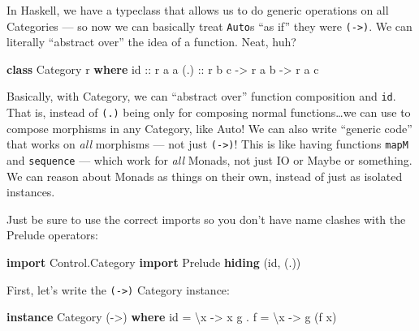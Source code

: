 \documentclass[]{article}
\newenvironment{Shaded}{}{}
\newcommand{\DataTypeTok}[1]{\textcolor[rgb]{0.56,0.13,0.00}{#1}}
\newcommand{\FunctionTok}[1]{\textcolor[rgb]{0.02,0.16,0.49}{#1}}
\newcommand{\KeywordTok}[1]{\textcolor[rgb]{0.00,0.44,0.13}{\textbf{#1}}}
\newcommand{\NormalTok}[1]{#1}
\newcommand{\OperatorTok}[1]{\textcolor[rgb]{0.40,0.40,0.40}{#1}}
\newcommand{\OtherTok}[1]{\textcolor[rgb]{0.00,0.44,0.13}{#1}}
\begin{document}
In Haskell, we have a typeclass that allows us to do generic operations on all
Categories --- so now we can basically treat \texttt{Auto}s ``as if'' they were
\texttt{(-\textgreater{})}. We can literally ``abstract over'' the idea of a
function. Neat, huh?

\begin{Shaded}
\begin{Highlighting}[]
\KeywordTok{class} \DataTypeTok{Category}\NormalTok{ r }\KeywordTok{where}
\OtherTok{    id  ::}\NormalTok{ r a a}
\OtherTok{    (.) ::}\NormalTok{ r b c }\OtherTok{{-}\textgreater{}}\NormalTok{ r a b }\OtherTok{{-}\textgreater{}}\NormalTok{ r a c}
\end{Highlighting}
\end{Shaded}

Basically, with Category, we can ``abstract over'' function composition and
\texttt{id}. That is, instead of \texttt{(.)} being only for composing normal
functions\ldots we can use to compose morphisms in any Category, like Auto! We
can also write ``generic code'' that works on \emph{all} morphisms --- not just
\texttt{(-\textgreater{})}! This is like having functions \texttt{mapM} and
\texttt{sequence} --- which work for \emph{all} Monads, not just IO or Maybe or
something. We can reason about Monads as things on their own, instead of just as
isolated instances.

Just be sure to use the correct imports so you don't have name clashes with the
Prelude operators:

\begin{Shaded}
\begin{Highlighting}[]
\KeywordTok{import} \DataTypeTok{Control.Category}
\KeywordTok{import} \DataTypeTok{Prelude} \KeywordTok{hiding}\NormalTok{ (id, (.))}
\end{Highlighting}
\end{Shaded}

First, let's write the \texttt{(-\textgreater{})} Category instance:

\begin{Shaded}
\begin{Highlighting}[]
\KeywordTok{instance} \DataTypeTok{Category}\NormalTok{ (}\OtherTok{{-}\textgreater{}}\NormalTok{) }\KeywordTok{where}
    \FunctionTok{id}    \OtherTok{=}\NormalTok{ \textbackslash{}x }\OtherTok{{-}\textgreater{}}\NormalTok{ x}
\NormalTok{    g }\OperatorTok{.}\NormalTok{ f }\OtherTok{=}\NormalTok{ \textbackslash{}x }\OtherTok{{-}\textgreater{}}\NormalTok{ g (f x)}
\end{Highlighting}
\end{Shaded}
\end{document}
